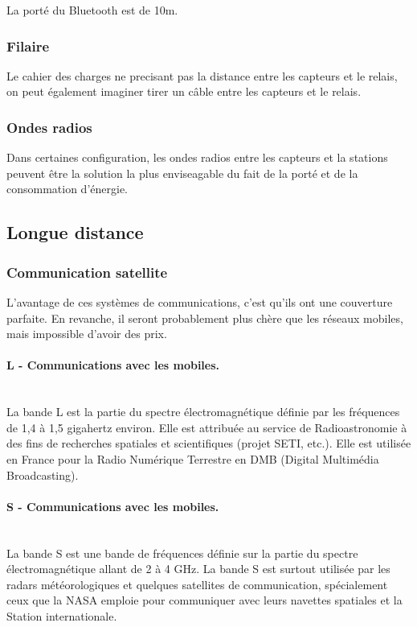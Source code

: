             La porté du Bluetooth est de 10m.
            
        \subsubsection{Filaire}
            Le cahier des charges ne precisant pas la distance entre les capteurs et le relais, on peut également imaginer tirer un câble entre les capteurs et le relais.
            
        \subsubsection{Ondes radios}
            Dans certaines configuration, les ondes radios entre les capteurs et la stations peuvent être la solution la plus enviseagable du fait de la porté et de la consommation d'énergie.
            

\subsection{Longue distance}

    \subsubsection{Communication satellite}

        L'avantage de ces systèmes de communications, c'est qu'ils ont une couverture parfaite.
        En revanche, il seront probablement plus chère que les réseaux mobiles, mais impossible d'avoir des prix.

        \paragraph{L - Communications avec les mobiles.}~\\
            La bande L est la partie du spectre électromagnétique définie par les fréquences de 1,4 à 1,5 gigahertz environ. Elle est attribuée au service de Radioastronomie à des fins de recherches spatiales et scientifiques (projet SETI, etc.). Elle est utilisée en France pour la Radio Numérique Terrestre en DMB (Digital Multimédia Broadcasting).

        \paragraph{S - Communications avec les mobiles.}~\\
            La bande S est une bande de fréquences définie sur la partie du spectre électromagnétique allant de 2 à 4 GHz.
            La bande S est surtout utilisée par les radars météorologiques et quelques satellites de communication, spécialement ceux que la NASA emploie pour communiquer avec leurs navettes spatiales et la Station internationale.

